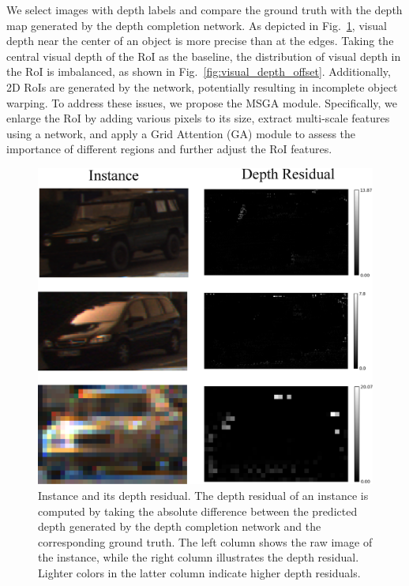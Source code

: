 \documentclass[journal]{IEEEtran}
\begin{document}
	We select images with depth labels and compare the ground truth with the depth map generated by the depth completion network. As depicted in Fig.~\ref{fig:depth_residual}, visual depth near the center of an object is more precise than at the edges. Taking the central visual depth of the RoI as the baseline, the distribution of visual depth in the RoI is imbalanced, as shown in Fig.~\ref{fig:visual_depth_offset}. Additionally, 2D RoIs are generated by the network, potentially resulting in incomplete object warping. To address these issues, we propose the MSGA module. Specifically, we enlarge the RoI by adding various pixels to its size, extract multi-scale features using a network, and apply a Grid Attention (GA) module to assess the importance of different regions and further adjust the RoI features.
	\begin{figure}[!t]
		\centering
		\includegraphics[width=1.0\linewidth]{Figures/depth_residual}
		\caption{Instance and its depth residual. The depth residual of an instance is computed by taking the absolute difference between the predicted depth generated by the depth completion network and the corresponding ground truth. The left column shows the raw image of the instance, while the right column illustrates the depth residual. Lighter colors in the latter column indicate higher depth residuals.}
		\label{fig:depth_residual}
	\end{figure}
\end{document}
